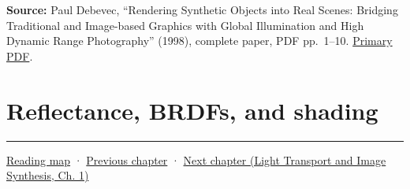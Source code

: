 \textbf{Source:} Paul Debevec, ``Rendering Synthetic Objects into Real Scenes: Bridging Traditional and Image-based Graphics with Global Illumination and High Dynamic Range Photography'' (1998), complete paper, PDF pp.~1--10. \href{https://www.pauldebevec.com/Research/IBL/debevec-siggraph98.pdf}{Primary PDF}.

\section{Reflectance, BRDFs, and shading}\label{03-visual-computing-i-ch004-reflectance-brdfs-and-shading}

\hypertarget{03-visual-computing-i-ch004-reflectance-brdfs-and-shading}{}

\begin{center}\rule{0.5\linewidth}{0.5pt}\end{center}

\hyperref[volume-reading-map]{Reading map} · \hyperref[03-visual-computing-i-ch003-lens-optics-and-image-formation]{Previous chapter} · \href{../04-Light-Transport-and-Image-Synthesis/main.pdf\#nameddest=03-visual-computing-i-ch005-reflectance-materials-and-light-transport}{Next chapter (Light Transport and Image Synthesis, Ch. 1)}
